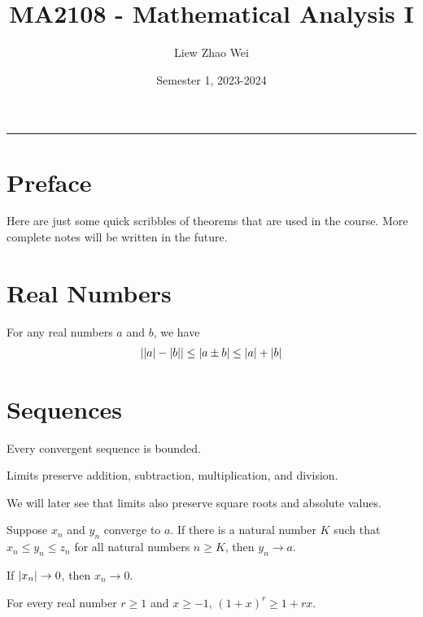 \documentclass{article}
\title{MA2108 - Mathematical Analysis I}
\author{Liew Zhao Wei}
\date{Semester 1, 2023-2024}
\begin{document}
\maketitle
\hrule

\section{Preface}

Here are just some quick scribbles of theorems that are used in the course.
More complete notes will be written in the future.

\section{Real Numbers}

\begin{theorem}
  For any real numbers $a$ and $b$, we have
  \begin{align}
    \abs{\abs{a} - \abs{b}} \leq \abs{a \pm b} \leq \abs{a} + \abs{b}
  \end{align}
\end{theorem}

\section{Sequences}

\begin{theorem}
  Every convergent sequence is bounded.
\end{theorem}

\begin{theorem}
  Limits preserve addition, subtraction, multiplication, and division.
\end{theorem}

We will later see that limits also preserve square roots and absolute values.

\begin{theorem}
  Suppose $x_n$ and $y_n$ converge to $a$.
  If there is a natural number $K$ such that $x_n \leq y_n \leq z_n$ for all natural numbers $n \geq K$, then $y_n \to a$.
\end{theorem}

\begin{theorem}
  If $\abs{x_n} \to 0$, then $x_n \to 0$.
\end{theorem}

\begin{theorem}
  For every real number $r \geq 1$ and $x \geq -1$, $(1 + x)^r \geq 1 + rx$.
\end{theorem}
\end{document}
